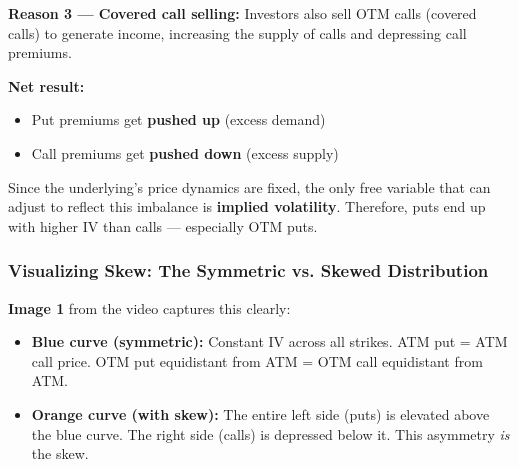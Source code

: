 \documentclass[12pt,openany]{book}
\begin{document}
\textbf{Reason 3 — Covered call selling:}
Investors also sell OTM calls (covered calls) to generate income, increasing the supply of calls and depressing call premiums.

\textbf{Net result:}
\begin{itemize}[leftmargin=*]
    \item Put premiums get \textbf{pushed up} (excess demand)
    \item Call premiums get \textbf{pushed down} (excess supply)
\end{itemize}

Since the underlying's price dynamics are fixed, the only free variable that can adjust to reflect this imbalance is \textbf{implied volatility}. Therefore, puts end up with higher IV than calls — especially OTM puts.

\subsubsection{Visualizing Skew: The Symmetric vs. Skewed Distribution}

\textbf{Image 1} from the video captures this clearly:


\begin{center}
\end{center}


\begin{itemize}[leftmargin=*]
    \item \textbf{Blue curve (symmetric):} Constant IV across all strikes. ATM put = ATM call price. OTM put equidistant from ATM = OTM call equidistant from ATM.
    \item \textbf{Orange curve (with skew):} The entire left side (puts) is elevated above the blue curve. The right side (calls) is depressed below it. This asymmetry \emph{is} the skew.
\end{itemize}
\end{document}
